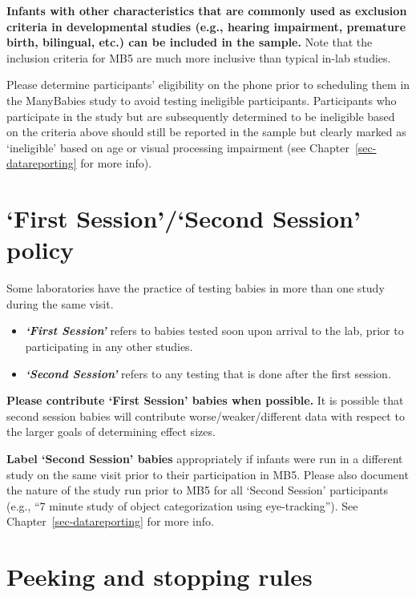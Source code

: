 \documentclass[
  letterpaper,
  DIV=11,
  numbers=noendperiod,
  oneside]{scrreprt}
\providecommand{\tightlist}{%
  \setlength{\itemsep}{0pt}\setlength{\parskip}{0pt}}
\begin{document}
\textbf{Infants with other characteristics that are commonly used as
exclusion criteria in developmental studies (e.g., hearing impairment,
premature birth, bilingual, etc.) can be included in the sample.} Note
that the inclusion criteria for MB5 are much more inclusive than typical
in-lab studies.

Please determine participants' eligibility on the phone prior to
scheduling them in the ManyBabies study to avoid testing ineligible
participants. Participants who participate in the study but are
subsequently determined to be ineligible based on the criteria above
should still be reported in the sample but clearly marked as
`ineligible' based on age or visual processing impairment (see
Chapter~\ref{sec-datareporting} for more info).

\section{`First Session'/`Second Session'
policy}\label{first-sessionsecond-session-policy}

Some laboratories have the practice of testing babies in more than one
study during the same visit.

\begin{itemize}
\tightlist
\item
  \textbf{\emph{`First Session'}} refers to babies tested soon upon
  arrival to the lab, prior to participating in any other studies.
\item
  \textbf{\emph{`Second Session'}} refers to any testing that is done
  after the first session.
\end{itemize}

\textbf{Please contribute `First Session' babies when possible.} It is
possible that second session babies will contribute
worse/weaker/different data with respect to the larger goals of
determining effect sizes.

\textbf{Label `Second Session' babies} appropriately if infants were run
in a different study on the same visit prior to their participation in
MB5. Please also document the nature of the study run prior to MB5 for
all `Second Session' participants (e.g., ``7 minute study of object
categorization using eye-tracking''). See
Chapter~\ref{sec-datareporting} for more info.

\section{Peeking and stopping rules}\label{peeking-and-stopping-rules}
\end{document}
